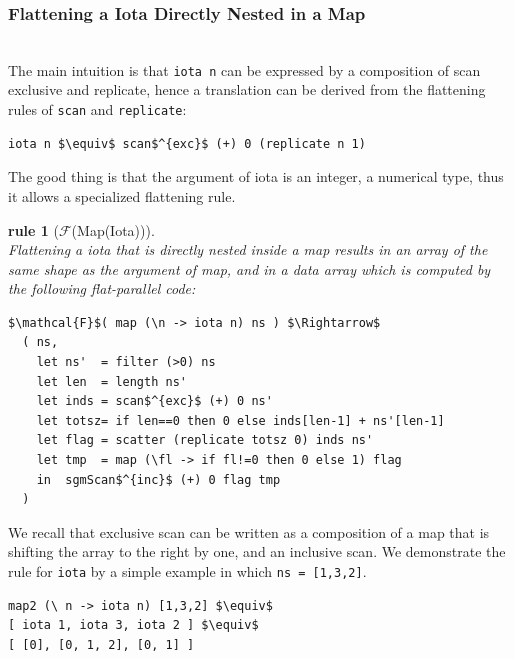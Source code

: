 \documentclass[acmsmall,review]{acmart}\settopmatter{printfolios=true,printccs=false,printacmref=false}
\newtheorem{rewrite}{rule}
\begin{document}
\subsubsection{Flattening a Iota Directly Nested in a Map}
\label{subsubsec:iota-in-map}
$\mbox{ }$\\

The main intuition is that {\tt iota n} can be expressed
by a composition of scan exclusive and replicate, hence a 
translation can be derived from the flattening rules
of \lstinline{scan} and \lstinline{replicate}:
\begin{lstlisting}[mathescape=true]
iota n $\equiv$ scan$^{exc}$ (+) 0 (replicate n 1)
\end{lstlisting}\vspace{-2ex}

The good thing is that the argument of iota is an integer,
a numerical type, thus it allows a specialized flattening rule.

\begin{rewrite}[$\mathcal{F}$(Map(Iota))]\label{Flat-Iota-In-Map}
$\mbox{ }$\\
Flattening a iota that is directly nested inside a map results
in an array of the same shape as the argument of map, and in a
data array which is computed by the following flat-parallel code:
\begin{lstlisting}[mathescape=true]
$\mathcal{F}$( map (\n -> iota n) ns ) $\Rightarrow$
  ( ns,
    let ns'  = filter (>0) ns
    let len  = length ns'
    let inds = scan$^{exc}$ (+) 0 ns'
    let totsz= if len==0 then 0 else inds[len-1] + ns'[len-1]
    let flag = scatter (replicate totsz 0) inds ns'
    let tmp  = map (\fl -> if fl!=0 then 0 else 1) flag
    in  sgmScan$^{inc}$ (+) 0 flag tmp
  )
\end{lstlisting}\vspace{-2ex}
\end{rewrite}

We recall that exclusive scan can be written as a composition
of a map that is shifting the array to the right by one, and 
an inclusive scan. We demonstrate the rule for \lstinline{iota}
by a simple example in which {\tt ns = [1,3,2]}.

\begin{lstlisting}[mathescape=true]
map2 (\ n -> iota n) [1,3,2] $\equiv$
[ iota 1, iota 3, iota 2 ] $\equiv$
[ [0], [0, 1, 2], [0, 1] ]
\end{lstlisting}\vspace{-2ex}
 
\end{document}
